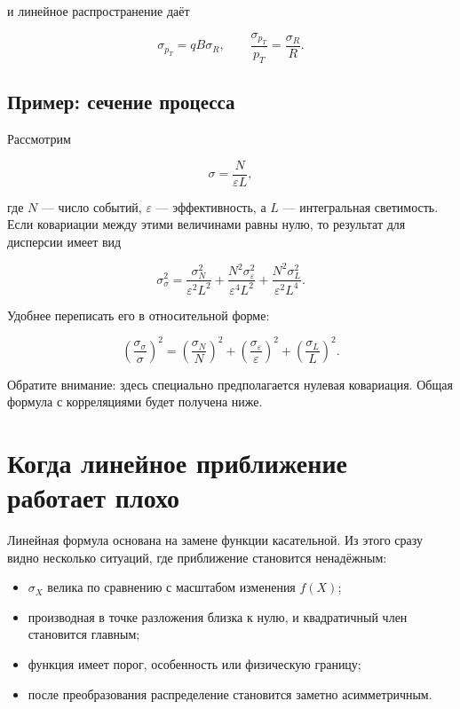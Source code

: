 \documentclass[
  russian,
  12pt,
  a4paper,
  a4paper,
  openany]{scrbook}
\providecommand{\tightlist}{%
  \setlength{\itemsep}{0pt}\setlength{\parskip}{0pt}}
\begin{document}
и линейное распространение даёт

\[
\boxed{
\sigma_{p_T}=qB\sigma_R,
\qquad
\frac{\sigma_{p_T}}{p_T}=\frac{\sigma_R}{R}.
}
\]

\subsection{Пример: сечение
процесса}\label{ux43fux440ux438ux43cux435ux440-ux441ux435ux447ux435ux43dux438ux435-ux43fux440ux43eux446ux435ux441ux441ux430}

Рассмотрим

\[
\sigma=\frac{N}{\varepsilon L},
\]

где \(N\) --- число событий, \(\varepsilon\) --- эффективность, а \(L\)
--- интегральная светимость. Если ковариации между этими величинами
равны нулю, то результат для дисперсии имеет вид

\[
\sigma_\sigma^2
=
\frac{\sigma_N^2}{\varepsilon^2L^2}
+
\frac{N^2\sigma_\varepsilon^2}{\varepsilon^4L^2}
+
\frac{N^2\sigma_L^2}{\varepsilon^2L^4}.
\]

Удобнее переписать его в относительной форме:

\[
\boxed{
\left(\frac{\sigma_\sigma}{\sigma}\right)^2
=
\left(\frac{\sigma_N}{N}\right)^2
+
\left(\frac{\sigma_\varepsilon}{\varepsilon}\right)^2
+
\left(\frac{\sigma_L}{L}\right)^2.
}
\]

Обратите внимание: здесь специально предполагается нулевая ковариация.
Общая формула с корреляциями будет получена ниже.

\section{Когда линейное приближение работает
плохо}\label{ux43aux43eux433ux434ux430-ux43bux438ux43dux435ux439ux43dux43eux435-ux43fux440ux438ux431ux43bux438ux436ux435ux43dux438ux435-ux440ux430ux431ux43eux442ux430ux435ux442-ux43fux43bux43eux445ux43e}

Линейная формула основана на замене функции касательной. Из этого сразу
видно несколько ситуаций, где приближение становится ненадёжным:

\begin{itemize}
\tightlist
\item
  \(\sigma_X\) велика по сравнению с масштабом изменения \(f(X)\);
\item
  производная в точке разложения близка к нулю, и квадратичный член
  становится главным;
\item
  функция имеет порог, особенность или физическую границу;
\item
  после преобразования распределение становится заметно асимметричным.
\end{itemize}
\end{document}
